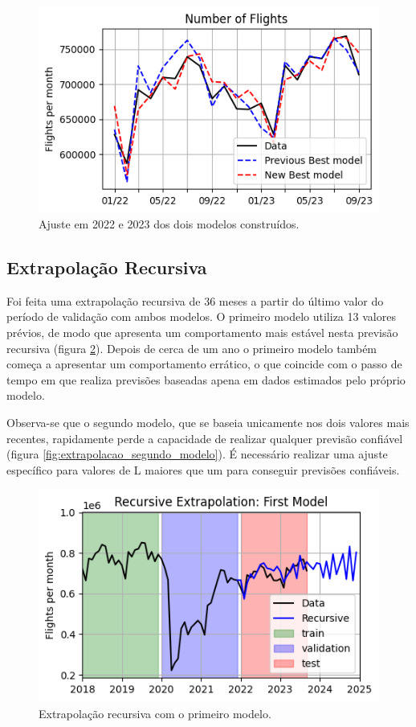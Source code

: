 \documentclass[final,5p]{elsarticle}
\numberwithin{equation}{section}
\begin{document}
        \begin{figure}[hbt!]
            \includegraphics[width=0.95\columnwidth]{C3_BestModel22_23.png}
            \caption{Ajuste em 2022 e 2023 dos dois modelos construídos.}
            \label{fig:ajuste_modelos}
        \end{figure}

        \subsection{Extrapolação Recursiva}

        Foi feita uma extrapolação recursiva de 36 meses a partir do último valor do período de validação com ambos modelos. O primeiro modelo utiliza 13 valores prévios, de modo que apresenta um comportamento mais estável nesta previsão recursiva (figura \ref{fig:extrapolacao_primeiro_modelo}). Depois de cerca de um ano o primeiro modelo também começa a apresentar um comportamento errático, o que coincide com o passo de tempo em que realiza previsões baseadas apena em dados estimados pelo próprio modelo.

        Observa-se que o segundo modelo, que se baseia unicamente nos dois valores mais recentes, rapidamente perde a capacidade de realizar qualquer previsão confiável (figura \ref{fig:extrapolacao_segundo_modelo}). É necessário realizar uma ajuste específico para valores de L maiores que um para conseguir previsões confiáveis.

        \begin{figure}[hbt!]
            \includegraphics[width=0.95\columnwidth]{C3_RecursiveExtrapolation.png}
            \caption{Extrapolação recursiva com o primeiro modelo.}
            \label{fig:extrapolacao_primeiro_modelo}
        \end{figure}
\end{document}
